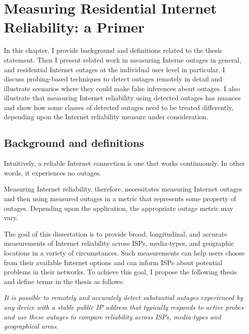 
\chapter{Measuring Residential Internet
  Reliability: a Primer}

\label{cpt:bg}

In this chapter, I provide background and definitions related to the
thesis statement. Then I present related work in measuring Interne
outages in general, and residential Internet outages at the individual
user level in particular. I discuss probing-based techniques to detect
outages remotely in detail and illustrate scenarios where they could
make false inferences about outages. I also illustrate that measuring
Internet reliability using detected outages has nuances and show how
some classes of detected outages need to be treated differently,
depending upon the Internet reliability measure under consideration.



\section{Background and definitions}

Intuitively, a reliable Internet connection is one that works
continuously. In other words, it experiences no outages. 

Measuring Internet reliability, therefore, necessitates measuring
Internet outages and then using measured outages in a metric that
represents some property of outages. Depending upon the application,
the appropriate outage metric may vary.

The goal of this dissertation is to provide broad, longitudinal, and accurate measurements of
Internet reliability across ISPs, media-types, and geographic
locations in a variety of circumstances. Such measurements can help
users choose from their available Internet options and can inform ISPs
about potential problems in their networks. To achieve this goal, I
propose the following thesis and define terms in the thesis as follows:



\emph{It is possible to remotely and accurately detect substantial outages
  experienced by any device with a stable public IP address that typically
  responds to active probes and use these outages to compare
  reliability across ISPs, media-types and geographical areas.}


